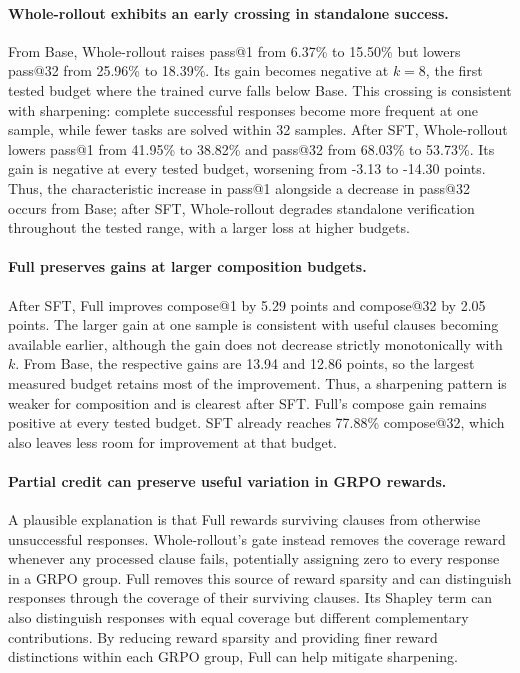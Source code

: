 \paragraph{Whole-rollout exhibits an early crossing in standalone success.}
From Base, Whole-rollout raises pass@1 from 6.37\% to 15.50\% but lowers
pass@32 from 25.96\% to 18.39\%. Its gain becomes negative at \(k=8\),
the first tested budget where the trained curve falls below Base.
This crossing is consistent with sharpening: complete successful responses
become more frequent at one sample, while fewer tasks are solved within
32 samples. After SFT, Whole-rollout lowers pass@1 from 41.95\% to 38.82\%
and pass@32 from 68.03\% to 53.73\%. Its gain is negative at every tested
budget, worsening from -3.13 to -14.30 points. Thus, the characteristic
increase in pass@1 alongside a decrease in pass@32 occurs from Base;
after SFT, Whole-rollout degrades standalone verification throughout the
tested range, with a larger loss at higher budgets.

\paragraph{Full preserves gains at larger composition budgets.}
After SFT, Full improves compose@1 by 5.29 points and compose@32 by
2.05 points. The larger gain at one sample is consistent with useful
clauses becoming available earlier, although the gain does not decrease
strictly monotonically with \(k\). From Base, the respective gains are
13.94 and 12.86 points, so the largest measured budget retains most of
the improvement. Thus, a sharpening pattern is weaker for composition
and is clearest after SFT. Full's compose gain remains positive at every
tested budget. SFT already reaches 77.88\% compose@32, which also leaves less
room for improvement at that budget.

\paragraph{Partial credit can preserve useful variation in GRPO rewards.}
A plausible explanation is that Full rewards surviving clauses from
otherwise unsuccessful responses. Whole-rollout's
gate instead removes the coverage reward whenever any processed clause
fails, potentially assigning zero to every response in a GRPO group.
Full removes this source of reward sparsity and can distinguish responses
through the coverage of their surviving clauses. Its Shapley term can also
distinguish responses with equal coverage but different complementary
contributions. By reducing reward sparsity and providing finer reward
distinctions within each GRPO group, Full can help mitigate sharpening.

